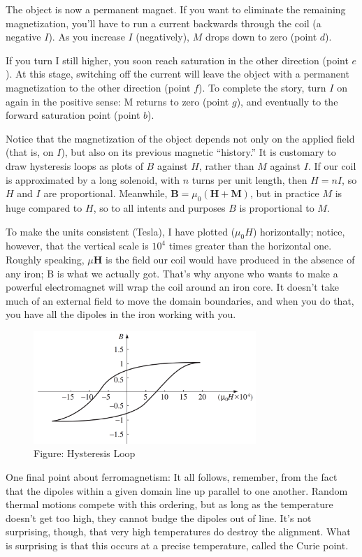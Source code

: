 \documentclass[../../../main.tex]{subfiles}
\begin{document}
The object is now a permanent magnet. If you want to eliminate the remaining magnetization, you’ll have to run a current backwards through the coil (a negative $I$). As you increase $I$ (negatively), $M$ drops down to zero (point $d$). 

If you turn I still higher, you soon reach saturation in the other direction (point $e$). At this stage, switching off the current will leave the object with a permanent magnetization to the other direction (point $f$). To complete the story, turn $I$ on again in the positive sense: M returns to zero (point $g$), and eventually to the forward saturation point (point $b$).

Notice that the magnetization of the object depends not only on the applied ﬁeld (that is, on $I$), but also on its previous magnetic “history.” It is customary to draw hysteresis loops as plots of $B$ against $H$, rather than $M$ against $I$. If our coil is approximated by a long solenoid, with $n$ turns per unit length, then $H = nI $, so $H$ and $I$ are proportional. Meanwhile, $\mathbf{B} = \mu_0(\mathbf{H} + \mathbf{M})$, but in practice $M$ is huge compared to $H$, so to all intents and purposes $B$ is proportional to $M$.

To make the units consistent (Tesla), I have plotted ($\mu_0 H$) horizontally; notice, however, that the vertical scale is $10^4$ times greater than the horizontal one. Roughly speaking, $\mu\mathbf{H}$ is the ﬁeld our coil would have produced in the absence of any iron; B is what we actually got. That’s why anyone who wants to make a powerful electromagnet will wrap the coil around an iron core. It doesn’t take much of an external ﬁeld to move the domain boundaries, and when you do that, you have all the dipoles in the iron working with you.

\begin{figure}
    \centering
    \includegraphics[width=0.75\textwidth]{../Rss/Electromagnetism/FieldInsideMatter/HysteresisLoop2.png}
    \caption*{Figure: Hysteresis Loop}
\end{figure}
One ﬁnal point about ferromagnetism: It all follows, remember, from the fact that the dipoles within a given domain line up parallel to one another. Random thermal motions compete with this ordering, but as long as the temperature doesn’t get too high, they cannot budge the dipoles out of line. It’s not surprising, though, that very high temperatures do destroy the alignment. What is surprising is that this occurs at a precise temperature, called the Curie point.
\end{document}
